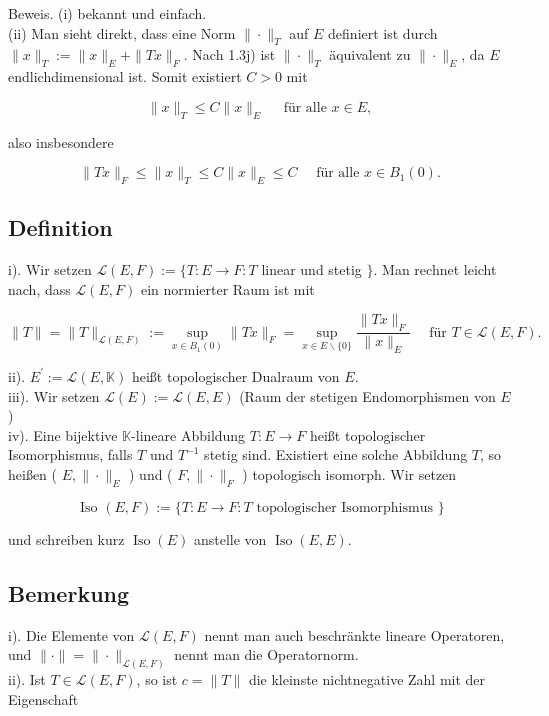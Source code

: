 \documentclass[10pt, letterpaper]{article}
\begin{document}
Beweis. (i) bekannt und einfach.\\
(ii) Man sieht direkt, dass eine Norm $\|\cdot\|_{T}$ auf $E$ definiert ist durch $\|x\|_{T}:= \|x\|_{E}+\|T x\|_{F}$. Nach 1.3j) ist $\|\cdot\|_{T}$ äquivalent zu $\|\cdot\|_{E}$, da $E$ endlichdimensional ist. Somit existiert $C>0$ mit

$$
\|x\|_{T} \leq C\|x\|_{E} \quad \text { für alle } x \in E,
$$

also insbesondere

$$
\|T x\|_{F} \leq\|x\|_{T} \leq C\|x\|_{E} \leq C \quad \text { für alle } x \in B_{1}(0) .
$$

\subsection*{Definition}
i). Wir setzen $\mathcal{L}(E, F):=\{T: E \rightarrow F: T$ linear und stetig $\}$. Man rechnet leicht nach, dass $\mathcal{L}(E, F)$ ein normierter Raum ist mit

$$
\|T\|=\|T\|_{\mathcal{L}(E, F)}:=\sup _{x \in B_{1}(0)}\|T x\|_{F}=\sup _{x \in E \backslash\{0\}} \frac{\|T x\|_{F}}{\|x\|_{E}} \quad \text { für } T \in \mathcal{L}(E, F) .
$$

ii). $E^{\prime}:=\mathcal{L}(E, \mathbb{K})$ heißt topologischer Dualraum von $E$.\\
iii). Wir setzen $\mathcal{L}(E):=\mathcal{L}(E, E)$ (Raum der stetigen Endomorphismen von $E$ )\\
iv). Eine bijektive $\mathbb{K}$-lineare Abbildung $T: E \rightarrow F$ heißt topologischer Isomorphismus, falls $T$ und $T^{-1}$ stetig sind. Existiert eine solche Abbildung $T$, so heißen ( $E,\|\cdot\|_{E}$ ) und ( $F,\|\cdot\|_{F}$ ) topologisch isomorph. Wir setzen

$$
\text { Iso }(E, F):=\{T: E \rightarrow F: T \text { topologischer Isomorphismus }\}
$$

und schreiben kurz $\operatorname{Iso}(E)$ anstelle von $\operatorname{Iso}(E, E)$.

\subsection*{Bemerkung}
i). Die Elemente von $\mathcal{L}(E, F)$ nennt man auch beschränkte lineare Operatoren, und $\|\cdot\|=\|\cdot\|_{\mathcal{L}(E, F)}$ nennt man die Operatornorm.\\
ii). Ist $T \in \mathcal{L}(E, F)$, so ist $c=\|T\|$ die kleinste nichtnegative Zahl mit der Eigenschaft
\end{document}
